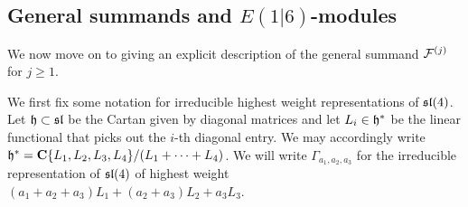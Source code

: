 \documentclass[../main.tex]{subfiles}
\begin{document}
\subsection{General summands and $E(1|6)$-modules}
We now move on to giving an explicit description of the general summand $\mathcal{F}^{(j)}$ for $j \geq 1$. 

We first fix some notation for irreducible highest weight representations of $\mathfrak{sl}(4)$. Let $\mathfrak{h}\subset \mathfrak{sl}$ be the Cartan given by diagonal matrices and let $L_i\in \mathfrak{h}^*$ be the linear functional that picks out the $i$-th diagonal entry. We may accordingly write $\mathfrak{h}^* = \mathbf{C} \{L_1, L_2, L_3, L_4\}/(L_1+\cdots + L_4)$. We will write $\Gamma_{a_1,a_2, a_3}$ for the irreducible representation of $\mathfrak{sl}(4)$ of highest weight $(a_1+a_2+a_3)L_1+(a_2+a_3)L_2 + a_3L_3$. 
\end{document}

